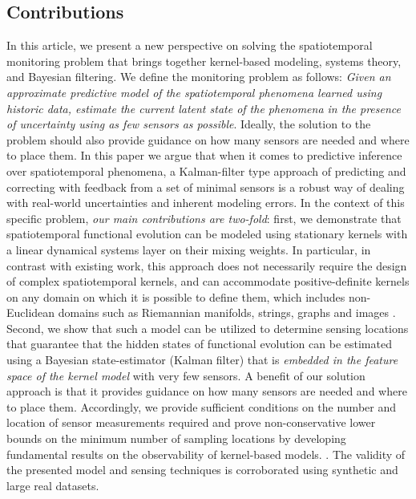 \subsection{Contributions}
In this article, we present a new perspective on solving the spatiotemporal monitoring problem that brings together kernel-based modeling, systems theory, and Bayesian filtering. We define the monitoring problem as follows: \textit{Given an approximate predictive model of the spatiotemporal phenomena learned using historic data, estimate the current latent state of the phenomena in the presence of uncertainty using as few sensors as possible}. Ideally, the solution to the problem should also provide guidance on how many sensors are needed and where to place them. In this paper we argue that when it comes to predictive inference over spatiotemporal phenomena, a Kalman-filter type approach of predicting and correcting with feedback from a set of minimal sensors is a robust way of dealing with real-world uncertainties and inherent modeling errors.  In the context of this specific problem, \textit{our main contributions are two-fold}: first, we demonstrate that spatiotemporal functional evolution can be modeled using stationary kernels with a linear dynamical systems layer on their mixing weights. In particular, in contrast with existing work, this approach does not necessarily require the design of complex spatiotemporal kernels, and can accommodate positive-definite kernels on any domain on which it is possible to define them, which includes non-Euclidean domains such as Riemannian manifolds, strings, graphs and images \cite{Jayasumana_PAMI2015_RBFs}. Second, we show that such a model can be utilized to determine sensing locations that guarantee that the hidden states of functional evolution can be estimated using a Bayesian state-estimator (Kalman filter) that is \textit{embedded in the feature space of the kernel model} with very few sensors. A benefit of our solution approach is that it provides guidance on how many sensors are needed and where to place them. Accordingly, we provide sufficient conditions on the number and location of sensor measurements required and prove non-conservative lower bounds on the minimum number of sampling locations by developing fundamental results on the observability of kernel-based models. . The validity of the presented model and sensing techniques is corroborated using synthetic and large real datasets. 

